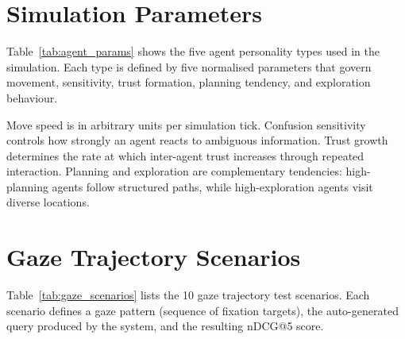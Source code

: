 \documentclass[journal]{IEEEtran}
\begin{document}
\appendix

\section{Simulation Parameters}
\label{app:sim_params}

Table~\ref{tab:agent_params} shows the five agent personality types used in the simulation.
Each type is defined by five normalised parameters that govern movement, sensitivity, trust formation, planning tendency, and exploration behaviour.

\begin{table}[!t]
\caption{Agent Personality Parameters}
\label{tab:agent_params}
\centering
{}
\end{table}

Move speed is in arbitrary units per simulation tick.
Confusion sensitivity controls how strongly an agent reacts to ambiguous information.
Trust growth determines the rate at which inter-agent trust increases through repeated interaction.
Planning and exploration are complementary tendencies: high-planning agents follow structured paths, while high-exploration agents visit diverse locations.

\section{Gaze Trajectory Scenarios}
\label{app:gaze_scenarios}

Table~\ref{tab:gaze_scenarios} lists the 10 gaze trajectory test scenarios.
Each scenario defines a gaze pattern (sequence of fixation targets), the auto-generated query produced by the system, and the resulting nDCG@5 score.
\end{document}
